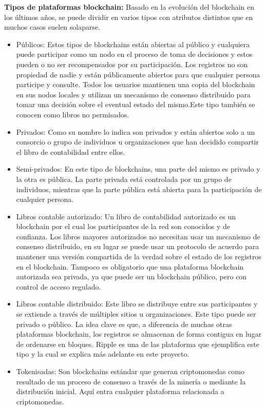 \textbf{Tipos de plataformas blockchain:} Basado en la evolución del blockchain en los últimos años, se puede dividir en varios tipos con atributos distintos que en muchos casos suelen solaparse.
\begin{itemize}
    \item Públicos:  Estos tipos de blockchains están abiertas al público y cualquiera puede participar como un nodo en el proceso de toma de decisiones y estos  pueden o no ser recompensados por su participación. Los registros no son propiedad de nadie y están públicamente abiertos para que cualquier persona participe y consulte. Todos los usuarios  mantienen una copia del blockchain en sus nodos locales y utilizan un mecanismo de consenso distribuido para tomar una decisión sobre el eventual estado del mismo.Este tipo  también se conocen como libros no permisados.
    \item Privados: Como su nombre lo indica son privados y están abiertos solo a un consorcio o grupo de individuos u organizaciones que han decidido compartir el libro de contabilidad entre ellos.
    \item Semi-privados: En este tipo de blockchains, una parte del mismo es privado y la otra es pública. La parte privada está controlada por un grupo de individuos, mientras que la parte pública está abierta para la participación de cualquier persona.
    \item Libros contable autorizado: Un libro de contabilidad autorizado es un blockchain por el cual los participantes de la red son conocidos y de confianza. Los libros mayores autorizados no necesitan usar un mecanismo de consenso distribuido, en su lugar se puede usar un protocolo de acuerdo para mantener una versión compartida de la verdad sobre el estado de los registros en el blockchain. Tampoco es obligatorio que una plataforma blockchain autorizada sea privada, ya que puede ser un blockchain público, pero con control de acceso regulado.
    \item Libros contable distribuido: Este libro se distribuye entre sus participantes y se extiende a través de múltiples sitios u organizaciones. Este tipo puede ser privado o público. La idea clave es que, a diferencia de muchas otras plataformas blockchain, los registros se almacenan de forma contigua en lugar de ordenarse en bloques. Ripple  es una de las plataforma  que ejemplifica este  tipo y la cual se explica más adelante en este proyecto.
    \item Tokenisadas: Son blockchains estándar que generan criptomonedas como resultado de un proceso de consenso a través de la minería o mediante la distribución inicial. Aquí entra cualquier plataforma relacionada a criptomonedas.
\end{itemize}

